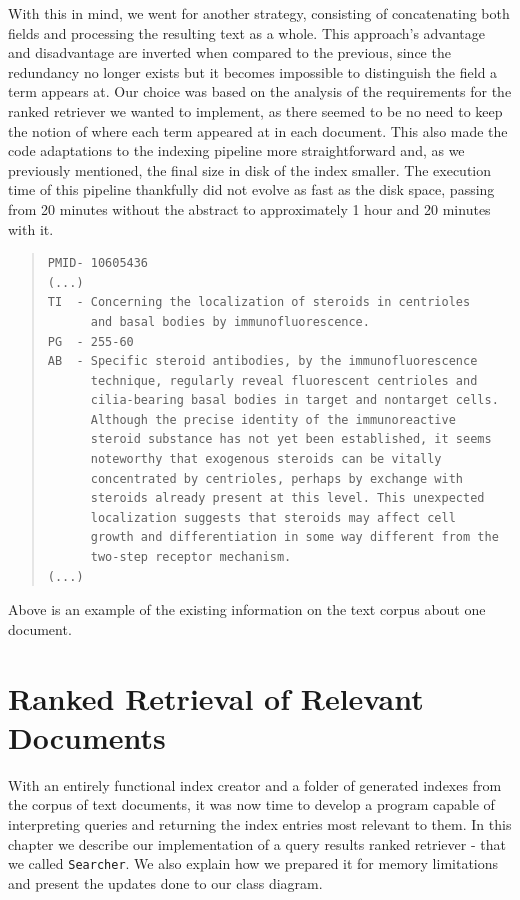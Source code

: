 \documentclass[12pt]{article}
\begin{document}
With this in mind, we went for another strategy, consisting of concatenating 
both fields and processing the resulting text as a whole.
This approach's advantage and disadvantage are inverted when compared to the 
previous, since the redundancy no longer exists but it becomes impossible to
distinguish the field a term appears at.
Our choice was based on the analysis of the requirements for the ranked retriever
we wanted to implement, as there seemed to be no need to keep the notion of where
each term appeared at in each document.
This also made the code adaptations to the indexing pipeline more straightforward 
and, as we previously mentioned, the final size in disk of the index smaller.
The execution time of this pipeline thankfully did not evolve as fast as the
disk space, passing from 20 minutes without the abstract to approximately 1 hour
and 20 minutes with it.

\begingroup
\addtolength\leftmargini{-0.4in}
\addtolength\baselineskip{-0.05in}
\begin{quote}
\begin{verbatim}
PMID- 10605436
(...)
TI  - Concerning the localization of steroids in centrioles
      and basal bodies by immunofluorescence.
PG  - 255-60
AB  - Specific steroid antibodies, by the immunofluorescence 
      technique, regularly reveal fluorescent centrioles and 
      cilia-bearing basal bodies in target and nontarget cells. 
      Although the precise identity of the immunoreactive 
      steroid substance has not yet been established, it seems 
      noteworthy that exogenous steroids can be vitally 
      concentrated by centrioles, perhaps by exchange with 
      steroids already present at this level. This unexpected 
      localization suggests that steroids may affect cell
      growth and differentiation in some way different from the 
      two-step receptor mechanism.
(...)
\end{verbatim}
\end{quote}
\endgroup
\vspace{-10pt}
Above is an example of the existing information on the text corpus about one document.

\newpage
\section{Ranked Retrieval of Relevant Documents}

With an entirely functional index creator and a folder of generated indexes from
the corpus of text documents, it was now time to develop a program capable of
interpreting queries and returning the index entries most relevant to them.
In this chapter we describe our implementation of a query results ranked retriever
- that we called \texttt{Searcher}.
We also explain how we prepared it for memory limitations and present the 
updates done to our class diagram.
\end{document}

